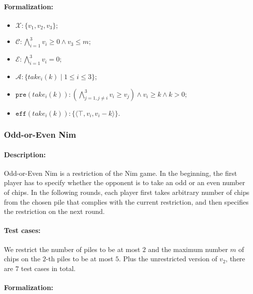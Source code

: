 \documentclass[review]{elsarticle}
\newcommand{\set}[1]{\{ #1 \}}
\newcommand{\tuple}[1]{\langle {#1} \rangle}
\newcommand{\true}{\top}
\newcommand{\statevar}{\mathcal{X}}
\newcommand{\act}{\mathcal{A}}
\newcommand{\constraint}{\mathcal{C}}
\newcommand{\estate}{\mathcal{E}}
\newcommand{\pre}{\mathtt{pre}}
\newcommand{\eff}{\mathtt{eff}}
\begin{document}
\paragraph{Formalization:}
\begin{itemize}
	\item $\statevar: \set{v_1, v_2, v_3}$;
	\item $\constraint:\bigwedge_{i=1}^{3} v_i \ge 0 \wedge v_3 \le m$;
	\item $\estate: \bigwedge_{i=1}^{3} v_i = 0$;
	\item $\act:\set{take_i(k) {\mid}1\le i \le 3}$;
	\item $\pre(take_i(k)) : (\bigwedge_{j=1,j\neq i}^{3} v_i \ge v_j) \wedge v_i \ge k \wedge  k > 0$;
	\item $\eff(take_i(k)) : \set{\tuple{\true, v_i, v_i-k}}$.
\end{itemize}

\subsubsection{Odd-or-Even Nim \protect\cite{SmiS2002}}

\paragraph{Description:} 
Odd-or-Even Nim is a restriction of the Nim game.
In the beginning, the first player has to specify whether the opponent is to take an odd or an even number of chips. 
In the following rounds, each player first takes arbitrary number of chips from the chosen pile that complies with the current restriction, and then specifies the restriction on the next round.

\paragraph{Test cases:}
We restrict the number of piles to be at most $2$ and the maximum number $m$ of chips on the $2$-th piles to be at most $5$. 
Plus the unrestricted version of $v_2$, there are $7$ test cases in total.
\paragraph{Formalization:}
\end{document}
